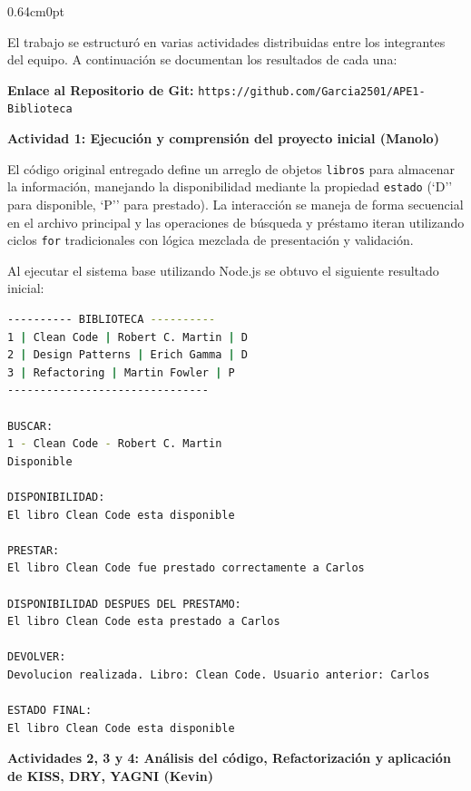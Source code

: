 \documentclass[12pt,letterpaper]{article}
\begin{document}
\vspace{2pt}
\begin{adjustwidth}{0.64cm}{0pt}

El trabajo se estructur\'o en varias actividades distribuidas entre los integrantes del equipo. A continuaci\'on se documentan los resultados de cada una:

\vspace{6pt}
\textbf{Enlace al Repositorio de Git:} \texttt{https://github.com/Garcia2501/APE1-Biblioteca}

\vspace{8pt}
\textbf{Actividad 1: Ejecuci\'on y comprensi\'on del proyecto inicial (Manolo)}

\vspace{4pt}
El c\'odigo original entregado define un arreglo de objetos \texttt{libros} para almacenar la informaci\'on, manejando la disponibilidad mediante la propiedad \texttt{estado} (`D'' para disponible, `P'' para prestado). La interacci\'on se maneja de forma secuencial en el archivo principal y las operaciones de b\'usqueda y pr\'estamo iteran utilizando ciclos \texttt{for} tradicionales con l\'ogica mezclada de presentaci\'on y validaci\'on. 

Al ejecutar el sistema base utilizando Node.js se obtuvo el siguiente resultado inicial:

\begin{lstlisting}[language=bash, frame=single]
---------- BIBLIOTECA ----------
1 | Clean Code | Robert C. Martin | D
2 | Design Patterns | Erich Gamma | D
3 | Refactoring | Martin Fowler | P
-------------------------------

BUSCAR:
1 - Clean Code - Robert C. Martin
Disponible

DISPONIBILIDAD:
El libro Clean Code esta disponible

PRESTAR:
El libro Clean Code fue prestado correctamente a Carlos

DISPONIBILIDAD DESPUES DEL PRESTAMO:
El libro Clean Code esta prestado a Carlos

DEVOLVER:
Devolucion realizada. Libro: Clean Code. Usuario anterior: Carlos

ESTADO FINAL:
El libro Clean Code esta disponible
\end{lstlisting}

\vspace{8pt}
\textbf{Actividades 2, 3 y 4: An\'alisis del c\'odigo, Refactorizaci\'on y aplicaci\'on de KISS, DRY, YAGNI (Kevin)}


\end{adjustwidth}
\end{document}
